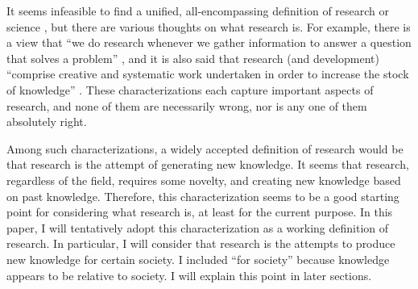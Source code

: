 
It seems infeasible to find a unified, all-encompassing definition of research or science \cite{chalmers2013thing,sep-scientific-method}, but there are various thoughts on what research is. For example, there is a view that ``we do research whenever we gather information to answer a question that solves a problem'' \cite{booth2003craft}, and it is also said that research (and development) ``comprise creative and systematic work undertaken in order to increase the stock of knowledge'' \cite{manual2015guidelines}. These characterizations each capture important aspects of research, and none of them are necessarily wrong, nor is any one of them absolutely right.

Among such characterizations, a widely accepted definition of research would be that research is the attempt of generating new knowledge. It seems that research, regardless of the field, requires some novelty, and creating new knowledge based on past knowledge. Therefore, this characterization seems to be a good starting point for considering what research is, at least for the current purpose. In this paper, I will tentatively adopt this characterization as a working definition of research. In particular, I will consider that research is the attempts to produce new knowledge for certain society. I included ``for society'' because knowledge appears to be relative to society. I will explain this point in later sections. 

